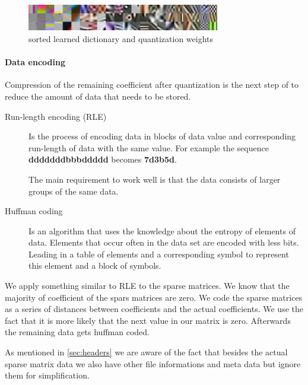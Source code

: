 \begin{figure}[h]
\centering
\includegraphics[width = 0.75\textwidth]{images/sorted.png}
\caption{sorted learned dictionary and quantization weights}
\label{fig:sorted}
\end{figure}

\paragraph{Data encoding}
Compression of the remaining coefficient after quantization is the next step
of to reduce the amount of data that needs to be stored.
\begin{description}
 \item[Run-length encoding (RLE)] Is the process of encoding data in blocks of
data value and corresponding run-length of data with the same value. 
For example the sequence {\bf dddddddbbbddddd} becomes {\bf7d3b5d}.

The main requirement to work well is that the data consists of larger groups of
the same
data.
  \item[Huffman coding] Is an algorithm that uses the knowledge about the
entropy of elements of data. Elements that occur often in the data set are
encoded with less bits. Leading in a table of elements and a corresponding
symbol to represent this element and a block of symbols.
\end{description}

We apply something similar to RLE to the sparse matrices. We know that the
majority of coefficient of the spars matrices are zero. We code the sparse
matrices as a series of distances between coefficients and the actual
coefficients. We use the fact that it is more likely that the next value in our
matrix is zero. Afterwards the remaining data gets huffman coded.

As mentioned in \ref{sec:headers} we are aware of the fact that besides
the actual sparse matrix data we also have other file informations and meta
data but ignore them for simplification.
  
